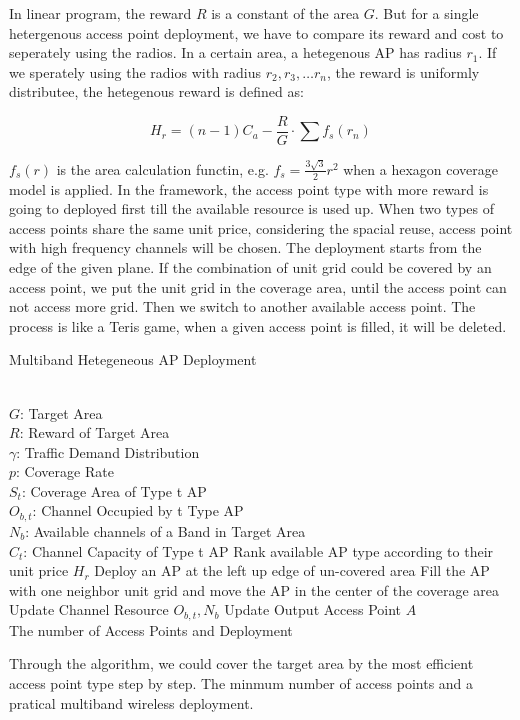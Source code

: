 In linear program, the reward $R$ is a constant of the area $G$. But for a single hetergenous access
point deployment, we have to compare its reward and cost to seperately using the radios.
In a certain area, a hetegenous AP has radius $r_1$. If we sperately using the radios with
radius $r_2,r_3,\dots r_n$, the reward is uniformly distributee, the hetegenous reward is defined as:

\begin{equation}
\label{eq:unitprice}
H_r=(n-1) C_a - \frac{R}{G}\cdot\sum f_s(r_n)
\end{equation}

$f_s(r)$ is the area calculation functin, e.g. $f_s = \frac{3\sqrt{3}}{2}r^2$ when a 
hexagon coverage model is applied. In the framework, the access point type with more reward 
is going to deployed first till the available resource is used up. When two types of access points
share the same unit price, considering the spacial reuse, access point with high frequency channels
will be chosen. The deployment starts from the edge of the given plane. If the combination of unit 
grid could be covered by an access point, we put the unit grid in the coverage area, until the access
point can not access more grid. Then we switch to another available access point. The process is like
a Teris game, when a given access point is filled, it will be deleted.
\begin{algorithm}
\caption{Multiband Hetegeneous AP Deployment}
\label{alg:gls}
\begin{algorithmic}[1]
\REQUIRE  ~~\\
$G$: Target Area \\
$R$: Reward of Target Area \\
$\gamma$: Traffic Demand Distribution\\
$p$: Coverage Rate\\
$S_t$: Coverage Area of Type t AP \\
$O_{b,t}$: Channel Occupied by t Type AP\\
$N_b$: Available channels of a Band in Target Area\\
$C_t$: Channel Capacity of Type t AP
\STATE Rank available AP type according to their unit price $H_r$
\STATE Deploy an AP at the left up edge of un-covered area
\STATE Fill the AP with one neighbor unit grid and move the AP in the center of the coverage area
\STATE Update Channel Resource $O_{b,t}, N_b$
\STATE Update Output Access Point $A$
\ENDWHILE
\ENSURE ~~\\
The number of Access Points and Deployment\\
\end{algorithmic}
\end{algorithm}
Through the algorithm, we could cover the target area by the most efficient access point type
step by step. The minmum number of access points and a pratical multiband wireless deployment.

